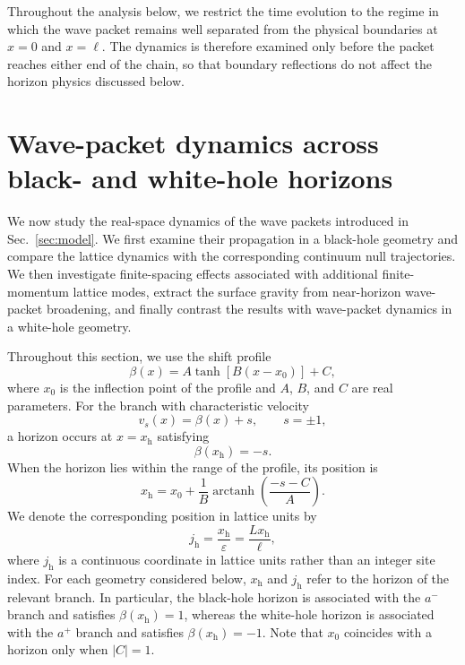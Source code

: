 \documentclass[reprint,amsmath,amssymb,aps,showkeys,superscriptaddress]{revtex4-2}
\begin{document}
Throughout the analysis below, we restrict the time evolution to the
regime in which the wave packet remains well separated from the
physical boundaries at $x=0$ and $x=\ell$. The dynamics is therefore
examined only before the packet reaches either end of the chain, so
that boundary reflections do not affect the horizon physics discussed
below.

\section{Wave-packet dynamics across black- and white-hole horizons}
\label{sec:dynamics}

We now study the real-space dynamics of the wave packets introduced
in Sec.~\ref{sec:model}. We first examine their propagation in a
black-hole geometry and compare the lattice dynamics with the
corresponding continuum null trajectories. We then investigate
finite-spacing effects associated with additional finite-momentum
lattice modes, extract the surface gravity from near-horizon
wave-packet broadening, and finally contrast the results with
wave-packet dynamics in a white-hole geometry.

Throughout this section, we use the shift profile
\begin{equation}
  \beta(x)
  =
  A\tanh\left[B(x-x_0)\right]+C,
  \label{eq:beta_profile}
\end{equation}
where $x_0$ is the inflection point of the profile and $A$, $B$,
and $C$ are real parameters. For the branch with characteristic velocity
\begin{equation}
  v_s(x)=\beta(x)+s,
  \qquad
  s=\pm1,
\end{equation}
a horizon occurs at $x=x_{\mathrm h}$ satisfying
\begin{equation}
  \beta(x_{\mathrm h})=-s.
  \label{eq:general_horizon_condition}
\end{equation}
When the horizon lies within the range of the profile, its position
is
\begin{equation}
  x_{\mathrm h}
  =
  x_0
  +
  \frac{1}{B}
  \operatorname{arctanh}
  \left(
    \frac{-s-C}{A}
  \right).
  \label{eq:horizon_position}
\end{equation}
We denote the corresponding position in lattice units by
\begin{equation}
  j_{\mathrm h}
  =
  \frac{x_{\mathrm h}}{\varepsilon}
  =
  \frac{Lx_{\mathrm h}}{\ell},
  \label{eq:lattice_horizon_position}
\end{equation}
where $j_{\mathrm h}$ is a continuous coordinate in lattice units
rather than an integer site index. For each geometry considered
below, $x_{\mathrm h}$ and $j_{\mathrm h}$ refer to the horizon of
the relevant branch. In particular, the black-hole horizon is
associated with the $a^-$ branch and satisfies
$\beta(x_{\mathrm h})=1$, whereas the white-hole horizon is
associated with the $a^+$ branch and satisfies
$\beta(x_{\mathrm h})=-1$.
Note that $x_0$ coincides with a horizon only when $|C|=1$.
\end{document}
